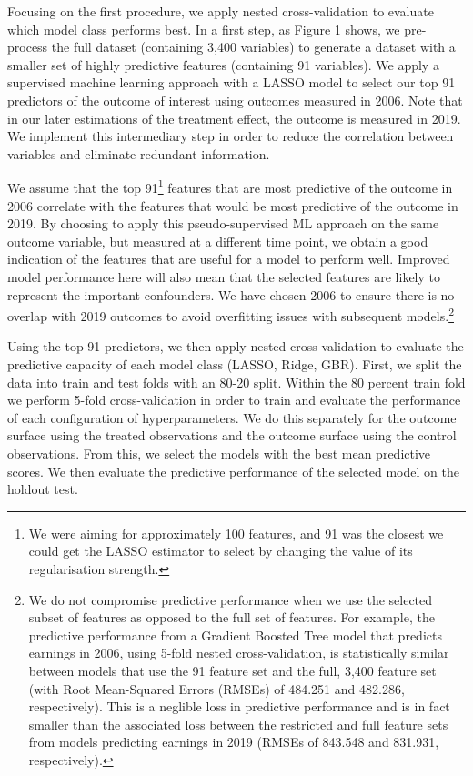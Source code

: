 \documentclass[12pt, a4paper]{article}
\begin{document}
Focusing on the first procedure, we apply nested cross-validation to evaluate
which model class performs best. In a first step, as Figure 1 shows, we
pre-process the full dataset (containing 3,400 variables) to generate a dataset
with a smaller set of highly predictive features (containing 91 variables). We
apply a supervised machine learning approach with a LASSO model to select our
top 91 predictors of the outcome of interest using outcomes measured in 2006.
Note that in our later estimations of the treatment effect, the outcome is
measured in 2019. We implement this intermediary step in order to reduce the
correlation between variables and eliminate redundant information.

We assume that the top 91\footnote{We were aiming for approximately 100
features, and 91 was the closest we could get the LASSO estimator to select by
changing the value of its regularisation strength.} features that are most
predictive of the outcome in 2006 correlate with the features that would be
most predictive of the outcome in 2019. By choosing to apply this
pseudo-supervised ML approach on the same outcome variable, but measured at a
different time point, we obtain a good indication of the features that are
useful for a model to perform well. Improved model performance here will also
mean that the selected features are likely to represent the important
confounders. We have chosen 2006 to ensure there is no overlap with 2019
outcomes to avoid overfitting issues with subsequent models.\footnote{We do not compromise predictive performance when we use the selected subset of features as opposed to the full set of features. For example, the predictive performance from a Gradient Boosted Tree model that predicts earnings in 2006, using 5-fold nested cross-validation, is statistically similar between models that use the 91 feature set and the full, 3,400 feature set (with Root Mean-Squared Errors (RMSEs) of 484.251 and 482.286, respectively). This is a neglible loss in predictive performance and is in fact smaller than the associated loss between the restricted and full feature sets from models predicting earnings in 2019 (RMSEs of 843.548 and 831.931, respectively).}

Using the top 91 predictors, we then apply nested cross validation to evaluate
the predictive capacity of each model class (LASSO, Ridge, GBR). First, we
split the data into train and test folds with an 80-20 split. Within the 80
percent train fold we perform 5-fold cross-validation in order to train and
evaluate the performance of each configuration of hyperparameters. We do this
separately for the outcome surface using the treated observations and the
outcome surface using the control observations. From this, we select the models
with the best mean predictive scores. We then evaluate the predictive
performance of the selected model on the holdout test.
\end{document}
